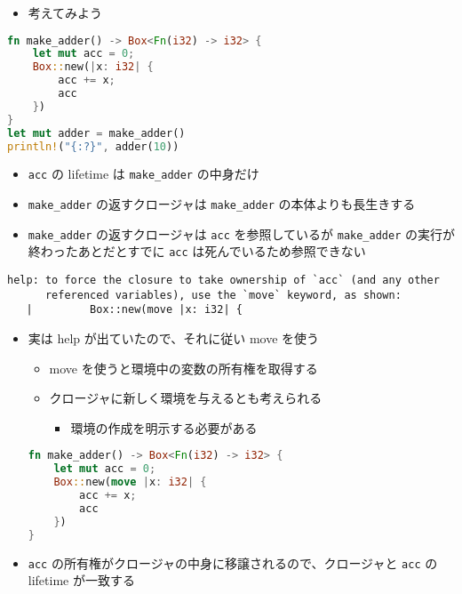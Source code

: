 \documentclass[dvipdfmx,11pt]{beamer}
\begin{document}
\begin{frame}[fragile]
  \begin{itemize}
  \item 考えてみよう
  \end{itemize}

  \begin{lstlisting}[language={Rust}]
fn make_adder() -> Box<Fn(i32) -> i32> {
    let mut acc = 0;
    Box::new(|x: i32| {
        acc += x;
        acc
    })
}
let mut adder = make_adder()
println!("{:?}", adder(10))
  \end{lstlisting}

  \begin{itemize}
  \item \verb+acc+ の lifetime は \verb+make_adder+ の中身だけ
  \item \verb+make_adder+ の返すクロージャは \verb+make_adder+ の本体よりも長生きする
  \item \verb+make_adder+ の返すクロージャは \verb+acc+ を参照しているが \verb+make_adder+ の実行が終わったあとだとすでに \verb+acc+ は死んでいるため参照できない
  \end{itemize}

\end{frame}

\begin{frame}[fragile]

  \begin{Verbatim}[fontsize=\scriptsize]
help: to force the closure to take ownership of `acc` (and any other
      referenced variables), use the `move` keyword, as shown:
   |         Box::new(move |x: i32| {
  \end{Verbatim}

  \begin{itemize}
  \item 実は help が出ていたので、それに従い move を使う
    \begin{itemize}
    \item move を使うと環境中の変数の所有権を取得する
    \item クロージャに新しく環境を与えるとも考えられる
      \begin{itemize}
      \item 環境の作成を明示する必要がある
      \end{itemize}
    \end{itemize}
    \begin{lstlisting}[language={Rust}]
fn make_adder() -> Box<Fn(i32) -> i32> {
    let mut acc = 0;
    Box::new(move |x: i32| {
        acc += x;
        acc
    })
}
    \end{lstlisting}
  \item \verb+acc+ の所有権がクロージャの中身に移譲されるので、クロージャと \verb+acc+ の lifetime が一致する
  \end{itemize}
\end{frame}
\end{document}
